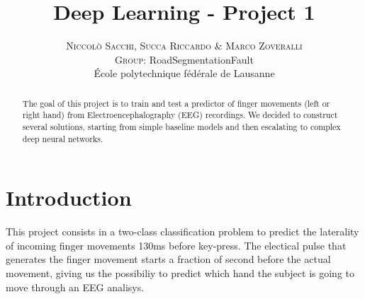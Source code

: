 \documentclass[10pt,conference,compsocconf]{IEEEtran}
\begin{document}
	
\pretitle{\begin{center}\Huge\bfseries} %
\posttitle{\end{center}} %
\title{Deep Learning - Project 1}

\author{
	\textsc{Niccol\`{o} Sacchi, Succa Riccardo \& Marco Zoveralli}
	\normalsize{} \\
	\textsc{Group:}
	\normalsize{RoadSegmentationFault}\\
	\normalsize \'{E}cole polytechnique f\'{e}d\'{e}rale de Lausanne
}

\maketitle

\begin{abstract}
  The goal of this project is to train and test a predictor of finger movements (left or right hand) from Electroencephalography
(EEG) recordings. We decided to construct several solutions, starting from simple baseline models and then escalating to complex deep neural networks. 
\end{abstract}

\section{Introduction}
This project consists in a two-class classification problem to predict the laterality of incoming finger movements 130ms before key-press. The electical pulse that generates the finger movement starts a fraction of second before the actual movement, giving us the possibiliy to predict which hand the subject is going to move through an EEG analisys.


\end{document}
